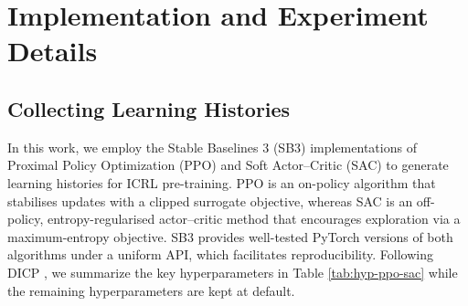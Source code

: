 \documentclass{article}
\begin{document}










\clearpage


\appendix

\section{Implementation and Experiment Details}





\subsection{Collecting Learning Histories}
\label{append_collect_history}

In this work, we employ the Stable Baselines 3 (SB3) implementations of Proximal Policy Optimization (PPO) \citep{schulman2017proximal} and Soft Actor–Critic (SAC) \citep{haarnoja2018soft} to generate learning histories for ICRL pre-training. PPO is an on-policy algorithm that stabilises updates with a clipped surrogate objective, whereas SAC is an off-policy, entropy-regularised actor–critic method that encourages exploration via a maximum-entropy objective. SB3 provides well-tested PyTorch versions of both algorithms under a uniform API, which facilitates reproducibility. 
%
Following DICP \cite{son2025distilling}, we summarize the key hyperparameters in Table \ref{tab:hyp-ppo-sac} while the remaining hyperparameters are kept at default.


\newcommand{\adjvcenter}[1]{%
  \raisebox{-.55\height}[0pt][0pt]{#1}%
}
\end{document}
